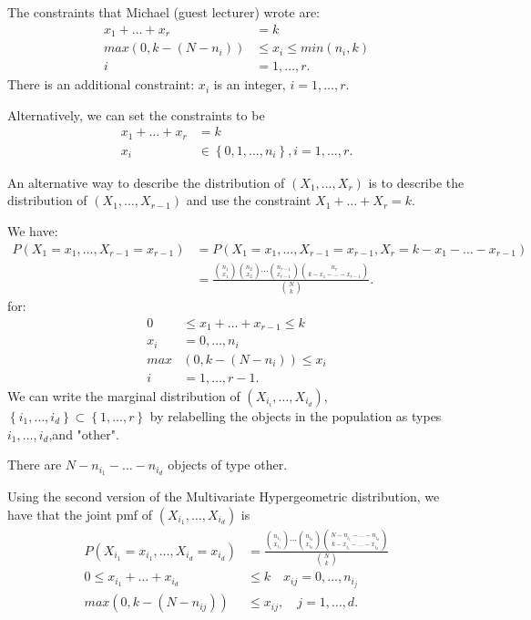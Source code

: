 
\begin{remark}
	The constraints that Michael (guest lecturer) wrote are: 
	\begin{align*}
		x_1 + \ldots+ x_{r} &=  k \\
		max(0, k - \left( N - n_i \right) ) &\le x_{i} \le min\left( n_{i}, k \right) \\
		i &= 1, \ldots, r
	.\end{align*}
	There is an additional constraint: $x_{i} $ is an integer, $i = 1, \ldots, r$.

	Alternatively, we can set the constraints to be 
	\begin{align*}
		x_1 + \ldots + x_r &= k \\
		x_{i} &\in  \left\{ 0, 1, \ldots, n_{i} \right\} , i = 1, \ldots, r
	.\end{align*}
\end{remark}

An alternative way to describe the distribution of $\left( X_1, \ldots, X_{r} \right) $ is to describe the distribution of $\left( X_1, \ldots, X_{r-1} \right) $ and use the constraint $X_1 + \ldots + X_{r} = k$. 

We have:
\begin{align*}
	P\left( X_1 = x_1, \ldots, X_{r-1} = x_{r-1} \right) &= P\left( X_1= x_1, \ldots, 
	X_{r-1} = x_{r-1}, X_r = k - x_1-\ldots-x_{r-1} \right)  \\
							     &=\frac{\binom{n_1}{x_1} \binom{n_2}{x_2} \cdots \binom{n_{r-1}}{x_{r-1}}  \binom{n_{r}}{k-x_1-\ldots-x_{r-1}}}{\binom{N}{k}}
.\end{align*}
for:
\begin{align*}
	0 &\le x_1 + \ldots + x_{r-1} \le k \\
	x_i &= 0, \ldots, n_{i} \\
	max&\left( 0, k-\left( N - n_{i} \right)  \right) \le x_{i}\\
	i &= 1, \ldots, r-1 
.\end{align*}
We can write the marginal distribution of $\left( X_{i_{i}}, \ldots, X_{i_{d}} \right) $, $\left\{ i_{1}, \ldots, i_{d} \right\}  \subset \left\{ 1, \ldots, r \right\} $ by relabelling the objects in the population as types $i_{1}, \ldots, i_{d}$,and "other". 

There are $N - n_{i_{1}} - \ldots - n_{i_{d}}$ objects of type other.

Using the second version of the Multivariate Hypergeometric distribution, we have that the joint pmf of $\left( X_{i_{1}}, \ldots, X_{i_{d}} \right) $ is 
\begin{align*}
	P\left( X_{i_{1}}= x_{i_{1}}, \ldots, X_{i_{d}} = x_{i_{d}} \right) 
	&= \frac{\binom{n_{i_{1}}}{x_{i_{1}}}  \cdots \binom{n_{i_{d}}}{x_{i_{d}}}  \binom{N - n_{i_{1}} - \ldots - n _{i_{d}}}{k-x_{i_{1}}-\ldots-x_{i_{d}}}}{\binom{N}{k}}
 \\
	0 \le x_{i_{1}} + \ldots + x_{i_{d}} &\le  k \quad x_{ij} = 0, \ldots, n_{i_{j}}\\
	max\left( 0, k- \left( N - n_{ij} \right)  \right) &\le x_{ij}, \quad j = 1, \ldots, d
.\end{align*}
